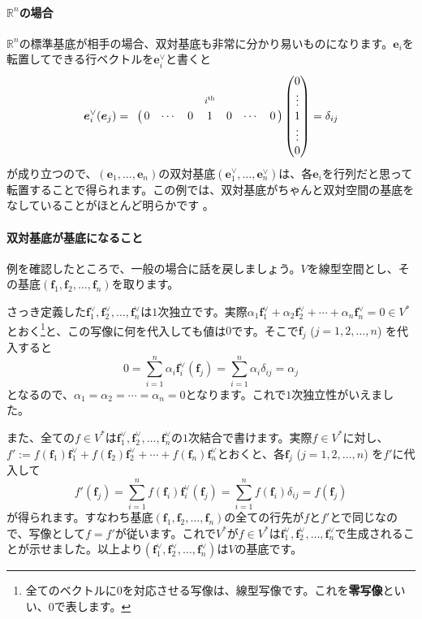 \paragraph{$\mathbb{R}^n$の場合} $\mathbb{R}^n$の標準基底が相手の場合、双対基底も非常に分かり易いものになります。$\bm{e}_i$を転置してできる行ベクトルを$\bm{e}^{\vee}_i$と書くと
\[
\bm{e}^{\vee}_i (\bm{e}_j)
=
\bordermatrix{
& & & & \scalebox{0.8}{$i^{\text{th}}$} \cr
& 0 & \cdots & 0 & 1 & 0 & \cdots & 0
}
\begin{pmatrix}
0 \\
\vdots \\
1 \\
\vdots \\
0
\end{pmatrix}
= \delta_{ij}
\]
が成り立つので、$(\bm{e}_1, \ldots, \bm{e}_n)$の双対基底$(\bm{e}^{\vee}_1, \ldots, \bm{e}^{\vee}_n)$は、各$\bm{e}_i$を行列だと思って転置することで得られます。この例では、双対基底がちゃんと双対空間の基底をなしていることがほとんど明らかです	。

\paragraph{双対基底が基底になること} 例を確認したところで、一般の場合に話を戻しましょう。$V$を線型空間とし、その基底$(\bm{f}_1, \bm{f}_2, \ldots, \bm{f}_n)$を取ります。

さっき定義した$\bm{f}^{\vee}_1, \bm{f}^{\vee}_2, \ldots, \bm{f}^{\vee}_n$は$1$次独立です。実際$\alpha_1 \bm{f}^{\vee}_1 + \alpha_2 \bm{f}^{\vee}_2 + \cdots + \alpha_n \bm{f}^{\vee}_n = 0 \in V^*$とおく\footnote{全てのベクトルに$0$を対応させる写像は、線型写像です。これを\textbf{零写像}といい、$0$で表します。}と、この写像に何を代入しても値は$0$です。そこで$\bm{f}_j$ ($j = 1, 2, \ldots, n$) を代入すると
\[
0 = \sum_{i = 1}^n \alpha_i \bm{f}^{\vee}_i (\bm{f}_j) = \sum_{i = 1}^n \alpha_i \delta_{ij} = \alpha_j
\]
となるので、$\alpha_1 = \alpha_2 = \cdots = \alpha_n = 0$となります。これで$1$次独立性がいえました。

また、全ての$f \in V^*$は$\bm{f}^{\vee}_1, \bm{f}^{\vee}_2, \ldots, \bm{f}^{\vee}_n$の$1$次結合で書けます。実際$f \in V^*$に対し、$f' := f(\bm{f}_1)\bm{f}^{\vee}_1 + f(\bm{f}_2)\bm{f}^{\vee}_2 + \cdots + f(\bm{f}_n)\bm{f}^{\vee}_n$とおくと、各$\bm{f}_j$ ($j = 1, 2, \ldots, n$) を$f'$に代入して
\[
f'(\bm{f}_j) = \sum_{i = 1}^n f(\bm{f}_i)\bm{f}^{\vee}_i(\bm{f}_j) = \sum_{i = 1}^n f(\bm{f}_i) \delta_{ij} = f(\bm{f}_j)
\]
が得られます。すなわち基底$(\bm{f}_1, \bm{f}_2, \ldots, \bm{f}_n)$の全ての行先が$f$と$f'$とで同じなので、写像として$f = f'$が従います。これで$V^*$が$f \in V^*$は$\bm{f}^{\vee}_1, \bm{f}^{\vee}_2, \ldots, \bm{f}^{\vee}_n$で生成されることが示せました。以上より$(\bm{f}^{\vee}_1, \bm{f}^{\vee}_2, \ldots, \bm{f}^{\vee}_n)$は$V$の基底です。

